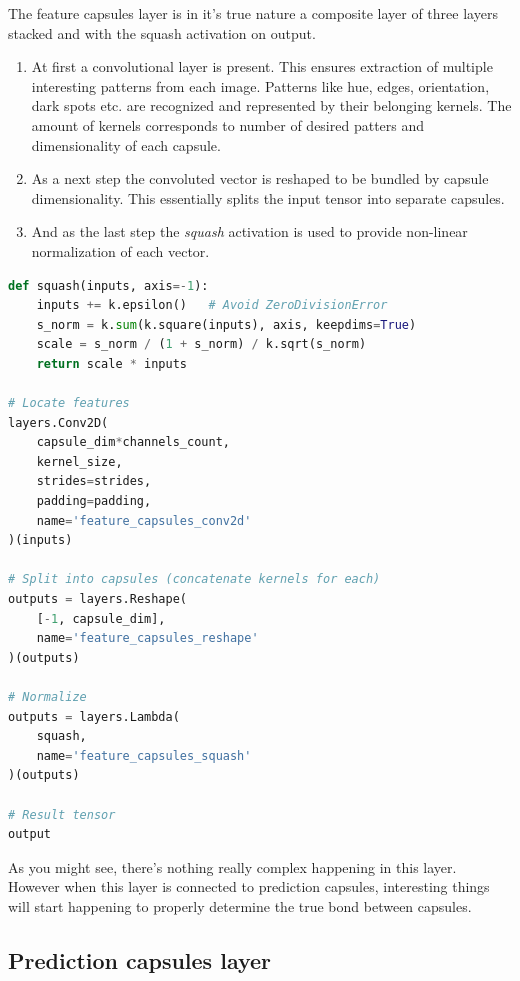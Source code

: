 The feature capsules layer is in it's true nature a composite layer of three layers stacked and with the squash activation on output.

\begin{enumerate}
    \item At first a convolutional layer is present. This ensures extraction of multiple interesting patterns from each image. Patterns like hue, edges, orientation, dark spots etc. are recognized and represented by their belonging kernels. The amount of kernels corresponds to number of desired patters and dimensionality of each capsule.
    \item As a next step the convoluted vector is reshaped to be bundled by capsule dimensionality. This essentially splits the input tensor into separate capsules.
    \item And as the last step the \textit{squash} activation is used to provide non-linear normalization of each vector.
\end{enumerate}


\begin{lstlisting}[language=Python, caption=Features capsule with squash activation]
def squash(inputs, axis=-1):
    inputs += k.epsilon()   # Avoid ZeroDivisionError
    s_norm = k.sum(k.square(inputs), axis, keepdims=True)
    scale = s_norm / (1 + s_norm) / k.sqrt(s_norm)
    return scale * inputs

# Locate features
layers.Conv2D(
    capsule_dim*channels_count,
    kernel_size,
    strides=strides,
    padding=padding,
    name='feature_capsules_conv2d'
)(inputs)

# Split into capsules (concatenate kernels for each)
outputs = layers.Reshape(
    [-1, capsule_dim],
    name='feature_capsules_reshape'
)(outputs)

# Normalize
outputs = layers.Lambda(
    squash,
    name='feature_capsules_squash'
)(outputs)

# Result tensor
output
\end{lstlisting}

As you might see, there's nothing really complex happening in this layer. However when this layer is connected to prediction capsules, interesting things will start happening to properly determine the true bond between capsules.

\subsection{Prediction capsules layer}

